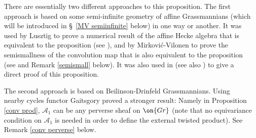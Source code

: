 \documentclass[]{pcmi}
\theoremstyle{plain}
\theoremstyle{remark}
\theoremstyle{definition}
\newcommand{\mA}{{\mathcal A}}
\newcommand{\Gr}{{\on{Gr}}}
\begin{document}
There are essentially two different approaches to this proposition. 
The first approach is based on some semi-infinite geometry of affine Grassmannians (which will be introduced in \S~\ref{MV semiinfinite} below) in one way or another.  It was used by Lusztig to prove a numerical result of the affine Hecke algebra \cite{Lu} that is equivalent to the proposition (see \cite[Proposition 2.2.1]{Gi1}), and  by Mirkovi\'c-Vilonen to prove the semismallness of the convolution map that is also equivalent to the proposition (see  \cite[Lemma 4.3, 4.4]{MV} and Remark \ref{semismall} below). It was also used in \cite[Corollary 9.7]{NP} (see also \cite[\S\ 2.2]{Z14})  to give a direct proof of this proposition.


The second approach is based on Beilinson-Drinfeld Grassmannians. Using nearby cycles functor Gaitsgory proved a stronger result: Namely in Proposition \ref{conv prod}, $\mA_1$ can be any perverse sheaf on $\Gr$ (note that no equivariance condition on $\mA_1$  is needed in order to define the external twisted product). See Remark \ref{conv perverse} below. 
 
\end{document}
